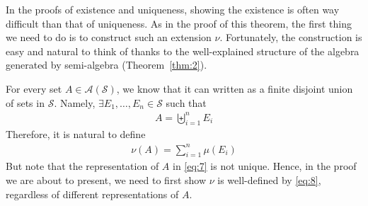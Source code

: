 \documentclass[thmcnt=section, 12pt, color=purple]{my-elegantbook}
\begin{document}
In the proofs of existence and uniqueness,
showing the existence is often way difficult than that of uniqueness.
As in the proof of this theorem, 
the first thing we need to do is to
construct such an extension $\nu$.
Fortunately, the construction is easy and natural to think of 
thanks to the well-explained 
structure of the algebra generated by semi-algebra (Theorem~\ref{thm:2}).

For every set $A \in \mathcal{A}(\mathcal{S})$,
we know that it can written
as a finite disjoint union of sets in $\mathcal{S}$.
Namely, $\exists E_1, \ldots, E_n \in \mathcal{S}$ such that 
\begin{align}
	A = \biguplus_{i=1}^n E_i
	\label{eq:7}
\end{align}
Therefore, it is natural to define
\begin{align}
	\nu(A) = \sum_{i=1}^n \mu(E_i)
	\label{eq:8}
\end{align}
But note that the representation of $A$ in \eqref{eq:7}
is not unique.
Hence, in the proof we are about to present,
we need to first show $\nu$
is well-defined by \eqref{eq:8},
regardless of different representations of $A$.
\end{document}
